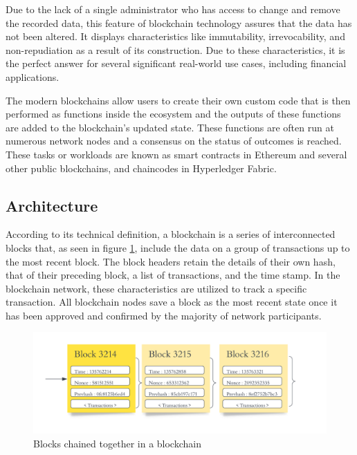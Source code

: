 \vspace{.5cm}

Due to the lack of a single administrator who has access to change and remove the recorded data, this feature of blockchain technology assures that the data has not been altered. It displays characteristics like immutability, irrevocability, and non-repudiation as a result of its construction. Due to these characteristics, it is the perfect answer for several significant real-world use cases, including financial applications.

\vspace{.5cm}

The modern blockchains allow users to create their own custom code that is then performed as functions inside the ecosystem and the outputs of these functions are added to the blockchain's updated state. These functions are often run at numerous network nodes and a consensus on the status of outcomes is reached. These tasks or workloads are known as smart contracts in Ethereum and several other public blockchains, and chaincodes in Hyperledger Fabric.


\subsection{Architecture}
According to its technical definition, a blockchain is a series of interconnected blocks that, as seen in figure \ref{Blocks chained together in a blockchain}, include the data on a group of transactions up to the most recent block. The block headers retain the details of their own hash, that of their preceding block, a list of transactions, and the time stamp. In the blockchain network, these characteristics are utilized to track a specific transaction. All blockchain nodes save a block as the most recent state once it has been approved and confirmed by the majority of network participants.

 \vspace{.5cm}
 
\begin{figure}[h]
  \includegraphics[width=\textwidth]{includes/figures/blocks.png}
  \caption{Blocks chained together in a blockchain \cite{bcdig}}
  \label{Blocks chained together in a blockchain}
\end{figure}


